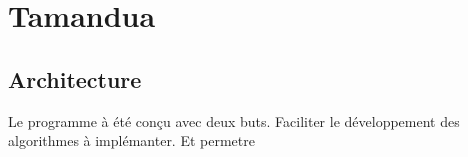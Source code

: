 \chapter{Tamandua}
\section{Architecture}
Le programme à été conçu avec deux buts. Faciliter le développement des 
algorithmes à implémanter. Et permetre 
